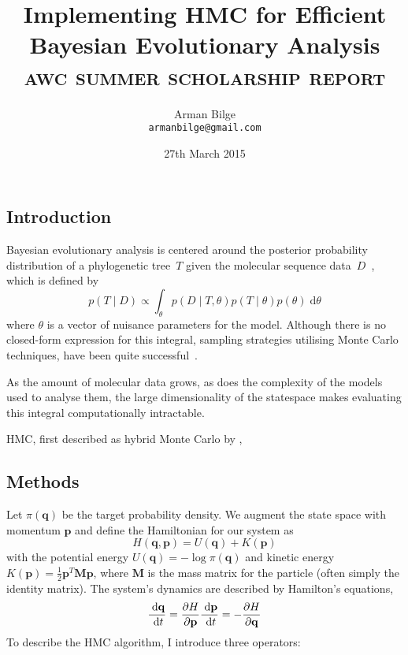 \documentclass{article}
\title{Implementing \acl{HMC} for Efficient Bayesian Evolutionary Analysis \\
           \Large\textsc{awc summer scholarship report}}
\author{Arman Bilge \\ \texttt{armanbilge@gmail.com}}
\date{27th March 2015}
\newcommand{\dd}{\; \mathrm{d}}
\renewcommand{\vec}[1]{\ensuremath{\mathbf{#1}}}
\newcommand{\mat}[1]{\ensuremath{\mathbf{#1}}}
\begin{document}
    \maketitle

    \subsection*{Introduction}

    Bayesian evolutionary analysis is centered around the posterior probability
        distribution of a phylogenetic tree~$T$ given the molecular sequence
        data~$D$~\cite{Bou+14}, which is defined by
        \begin{equation}
            p\left(T \mid D\right)
                \propto \int_\theta p\left(D \mid T,\theta\right)
                p\left(T \mid \theta\right) p\left(\theta\right) \dd\theta
        \end{equation}
        where $\theta$ is a vector of nuisance parameters for the model.
    Although there is no closed-form expression for this integral, sampling
        strategies utilising Monte Carlo techniques,  have been quite
        successful~\cite{RH03,Dru+12,Bou+14}.

    As the amount of molecular data grows, as does the complexity of the models
        used to analyse them, the large dimensionality of the statespace makes
        evaluating this integral computationally intractable.

    \ac{HMC}, first described as hybrid Monte Carlo by \textcite{Dua+87},

    \subsection*{Methods}

    Let $\pi\left(\vec{q}\right)$ be the target probability density.
    We augment the state space with momentum $\vec{p}$ and define the
        Hamiltonian for our system as
        \begin{equation}
            H\left(\vec{q},\vec{p}\right)
            = U\left(\vec{q}\right) + K\left(\vec{p}\right)
        \end{equation}
        with the potential energy
        $U\left(\vec{q}\right) = -\log{\pi\left(\vec{q}\right)}$ and kinetic
        energy $K\left(\vec{p}\right) = \frac{1}{2} \vec{p}^T \mat{M} \vec{p}$,
        where $\mat{M}$ is the mass matrix for the particle (often simply the
        identity matrix).
    The system's dynamics are described by Hamilton's equations,
        \begin{equation}
            \frac{\dd \vec{q}}{\dd t} = \frac{\partial H}{\partial \vec{p}} \\
            \frac{\dd \vec{p}}{\dd t} = - \frac{\partial H}{\partial \vec{q}}
        \end{equation}
    To describe the \ac{HMC} algorithm, I introduce three operators:
\end{document}

